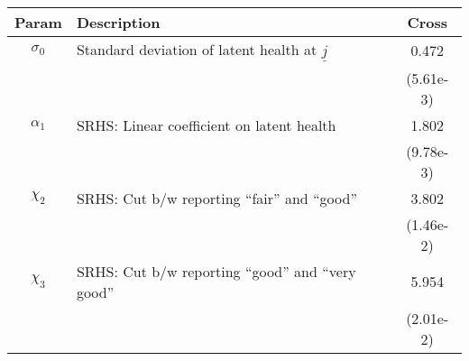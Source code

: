 \begin{table}[ht]\label{CrossWomenSRHSparams}
\footnotesize
\begin{center}
\begin{tabular}{clc}
\hline \hline
Param & Description & Cross \\
\hline
$\sigma_{0}$ & Standard deviation of latent health at $\underline{j}$ & 0.472 \\
 & & (5.61e-3) \\
$\alpha_1$ & SRHS: Linear coefficient on latent health & 1.802 \\
 & & (9.78e-3) \\
$\chi_2$ & SRHS: Cut b/w reporting ``fair'' and ``good'' & 3.802 \\
 & & (1.46e-2) \\
$\chi_3$ & SRHS: Cut b/w reporting ``good'' and ``very good'' & 5.954 \\
 & & (2.01e-2) \\
\hline\hline
\end{tabular}
\end{center}
\end{table}
